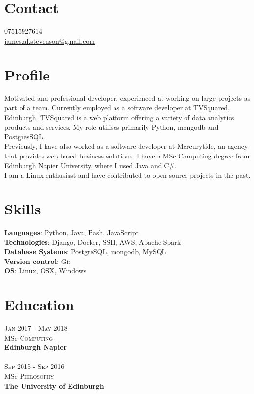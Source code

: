 \documentclass[14pt, a4paper]{extarticle}
\begin{document}
\par{\bigskip\par
\section{Contact}
\large
07515927614\\
\href{mailto:james.al.stevenson@gmail.com}{james.al.stevenson@gmail.com}\\
}

\begin{multicols}{2}

\section{Profile}
\noindent Motivated and professional developer, experienced at working on large projects as part of a team. Currently employed as a software developer at TVSquared, Edinburgh. TVSquared is a web platform offering a variety of data analytics products and services. My role utilises primarily Python, mongodb and PostgresSQL.\\
Previously, I have also worked as a software developer at Mercurytide, an agency that provides web-based business solutions. I have a MSc Computing degree from Edinburgh Napier University, where I used Java and C\#.\\
I am a Linux enthusiast and have contributed to open source projects in the past.

\section{Skills}
\noindent\textbf{Languages}: Python, Java, Bash, JavaScript\\
\textbf{Technologies}: Django, Docker, SSH, AWS, Apache Spark\\
\textbf{Database Systems}: PostgreSQL, mongodb, MySQL\\
\textbf{Version control}: Git\\
\textbf{OS}: Linux, OSX, Windows

\section{Education}
\noindent\textsc{Jan} 2017 - \textsc{May} 2018\\
MSc \textsc{Computing} \\
\textbf{Edinburgh Napier}\\~\\
\textsc{Sep} 2015 - \textsc{Sep} 2016\\
MSc \textsc{Philosophy} \\ 
\textbf{The University of Edinburgh}


\end{multicols}
\end{document}
